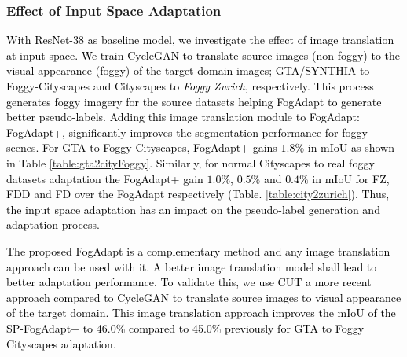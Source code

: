 \documentclass[final,5p,times,twocolumn]{elsarticle}
\begin{document}
\subsubsection{Effect of Input Space Adaptation}
\textcolor{black}{
With ResNet-38 \cite{wu2019Resnet38} as baseline model, we investigate the effect of image translation at input space.
We train CycleGAN \cite{hoffman2017cycada} to translate source images (non-foggy) to the visual appearance (foggy) of the target domain images; GTA/SYNTHIA to Foggy-Cityscapes and Cityscapes to \textit{Foggy Zurich}, respectively. This process generates foggy imagery for the source datasets helping FogAdapt to generate better pseudo-labels. 
Adding this image translation module to FogAdapt: FogAdapt+, significantly improves the segmentation performance for foggy scenes. For GTA to Foggy-Cityscapes, FogAdapt+ gains $1.8\%$ in mIoU as shown in Table \ref{table:gta2cityFoggy}. 
Similarly, for normal Cityscapes to real foggy datasets adaptation the FogAdapt+ gain $1.0\%$, $0.5\%$ and $0.4\%$ in mIoU for FZ, FDD and FD over the FogAdapt respectively (Table. \ref{table:city2zurich}). 
Thus, the input space adaptation has an impact on the pseudo-label generation and adaptation process.}

\textcolor{black}{ The proposed FogAdapt is a complementary method and any image translation approach can be used with it. A better image translation model shall lead to better adaptation performance. To validate this, we use CUT \cite{park2020cut} a more recent approach compared to CycleGAN \cite{hoffman2017cycada} to translate source images to visual appearance of the target domain. This image translation approach improves the mIoU of the SP-FogAdapt+ to 46.0\% compared to 45.0\% previously for GTA to Foggy Cityscapes adaptation.
}
\end{document}
